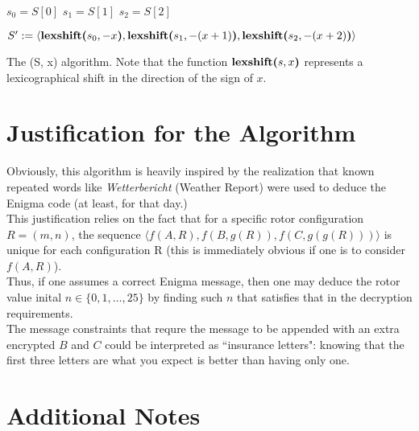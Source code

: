 \documentclass[12pt,a4paper,fleqn]{article}
\begin{document}
	\vspace{1cm}
	\begin{algorithm}[H] \label{alg2decode}
		\SetAlgoLined
		$s_0 = S[0]$\;
		$s_1 = S[1]$\;
		$s_2 = S[2]$\;
		
		\majorspace
		
		$S^\prime := \langle \textbf{lexshift(}s_0, -x\textbf{)}, \textbf{lexshift(}s_1, -(x+1)\textbf{)}, \textbf{lexshift(}s_2, -(x+2)\textbf{)} \rangle$\;
		
		\majorspace	
		
		\;
		
		\majorspace
		\caption{The \decodefn(S, x) algorithm. Note that the function $\textbf{lexshift(}s, x\textbf{)}$ represents a lexicographical shift in the direction of the sign of $x$. }
	\end{algorithm}

	\section{Justification for the Algorithm}
	Obviously, this algorithm is heavily inspired by the realization that known repeated words like \emph{Wetterbericht} (Weather Report) were used to deduce the Enigma code (at least, for that day.) \\


	This justification relies on the fact that for a specific rotor configuration $R = (m, n)$, the sequence $\langle f(A, R), f(B, g(R)), f(C, g(g(R))) \rangle$ is unique for each configuration R (this is immediately obvious if one is to consider $f(A, R)$). \\

Thus, if one assumes a correct Enigma message, then one may deduce the rotor value inital $n \in \{ 0, 1, \ldots , 25 \}$ by finding such $n$ that satisfies that in the decryption requirements. \\
 
 The message constraints that requre the message to be appended with an extra encrypted $B$ and $C$ could be interpreted as ``insurance letters": knowing that the first three letters are what you expect is better than having only one.

	

	\section{Additional Notes}	
	
\end{document}
